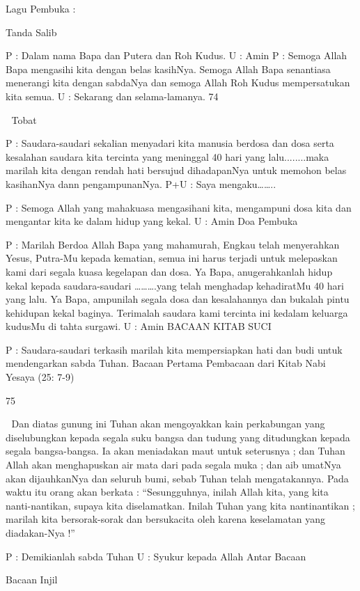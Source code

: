\documentclass[10pt,a5paper,fancyhdr]{memoir}
\begin{document}
Lagu Pembuka : 

Tanda Salib 

P 
: Dalam nama Bapa dan Putera dan Roh Kudus. 
U 
: Amin 
P 
: Semoga Allah Bapa mengasihi kita dengan belas 
kasihNya. Semoga Allah Bapa senantiasa menerangi kita 
dengan sabdaNya dan semoga Allah Roh Kudus 
mempersatukan kita semua. 
U 
: Sekarang dan selama-lamanya. 
74 



Tobat 

P 
: Saudara-saudari sekalian menyadari kita manusia berdosa 
dan dosa serta kesalahan saudara kita tercinta yang 
meninggal 40 hari yang lalu........maka marilah kita 
dengan rendah hati bersujud dihadapanNya untuk 
memohon belas kasihanNya dann pengampunanNya. 
P+U : Saya mengaku…….. 

P 
: Semoga Allah yang mahakuasa mengasihani kita, 
mengampuni dosa kita dan mengantar kita ke dalam hidup 
yang kekal. 
U : Amin 
Doa Pembuka 

P 
: Marilah Berdoa 
Allah Bapa yang mahamurah, Engkau telah menyerahkan 
Yesus, Putra-Mu kepada kematian, semua ini harus terjadi 
untuk melepaskan kami dari segala kuasa kegelapan dan 
dosa. Ya Bapa, anugerahkanlah hidup kekal kepada 
saudara-saudari ……….yang telah menghadap 
kehadiratMu 40 hari yang lalu. Ya Bapa, ampunilah 
segala dosa dan kesalahannya dan bukalah pintu 
kehidupan kekal baginya. Terimalah saudara kami 
tercinta ini kedalam keluarga kudusMu di tahta surgawi. 
U : Amin 
BACAAN KITAB SUCI 

P 
: Saudara-saudari terkasih marilah kita mempersiapkan hati 
dan budi untuk mendengarkan sabda Tuhan. 
Bacaan Pertama 
Pembacaan dari Kitab Nabi Yesaya (25: 7-9) 


75 



Dan diatas gunung ini Tuhan akan mengoyakkan kain 
perkabungan yang diselubungkan kepada segala suku bangsa 
dan tudung yang ditudungkan kepada segala bangsa-bangsa. Ia 
akan meniadakan maut untuk seterusnya ; dan Tuhan Allah 
akan menghapuskan air mata dari pada segala muka ; dan aib 
umatNya akan dijauhkanNya dan seluruh bumi, sebab Tuhan 
telah mengatakannya. Pada waktu itu orang akan berkata : 
“Sesungguhnya, inilah Allah kita, yang kita nanti-nantikan, 
supaya kita diselamatkan. Inilah Tuhan yang kita nantinantikan 
; marilah kita bersorak-sorak dan bersukacita oleh 
karena keselamatan yang diadakan-Nya !” 

P : Demikianlah sabda Tuhan 
U : Syukur kepada Allah 
Antar Bacaan 

Bacaan Injil 
\end{document}
